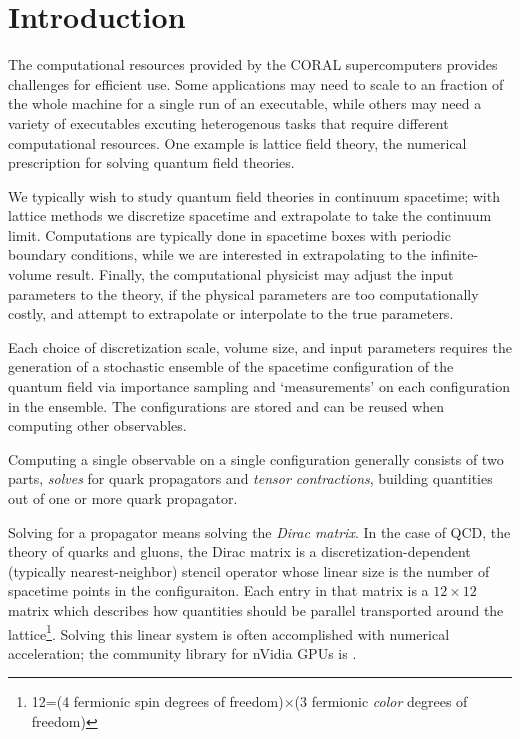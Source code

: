 \section{Introduction}

The computational resources provided by the CORAL supercomputers provides challenges for efficient use.
Some applications may need to scale to an  fraction of the whole machine for a single run of an executable, while others may need a variety of executables excuting heterogenous tasks that require different computational resources.  One example is lattice field theory, the numerical prescription for solving quantum field theories.

We typically wish to study quantum field theories in continuum spacetime; with lattice methods we discretize spacetime and extrapolate to take the continuum limit.
Computations are typically done in spacetime boxes with periodic boundary conditions, while we are interested in extrapolating to the infinite-volume result.
Finally, the computational physicist may adjust the input parameters to the theory, if the physical parameters are too computationally costly, and attempt to extrapolate or interpolate to the true parameters.

Each choice of discretization scale, volume size, and input parameters requires the generation of a stochastic ensemble of the spacetime configuration of the quantum field via importance sampling and `measurements' on each configuration in the ensemble.
The configurations are stored and can be reused when computing other observables.

Computing a single observable on a single configuration generally consists of two parts, \emph{solves} for quark propagators and \emph{tensor contractions}, building quantities out of one or more quark propagator.

Solving for a propagator means solving the \emph{Dirac matrix}.
In the case of QCD, the theory of quarks and gluons, the Dirac matrix is a discretization-dependent (typically nearest-neighbor) stencil operator whose linear size is the number of spacetime points in the configuraiton.
Each entry in that matrix is a $12\times12$ matrix which describes how quantities should be parallel transported around the lattice\footnote{12=(4 fermionic spin degrees of freedom)$\times$(3 fermionic \emph{color} degrees of freedom)}.
Solving this linear system is often accomplished with numerical acceleration; the community library for nVidia GPUs is \quda\cite{Clark:2009wm,Babich:2011np}.

